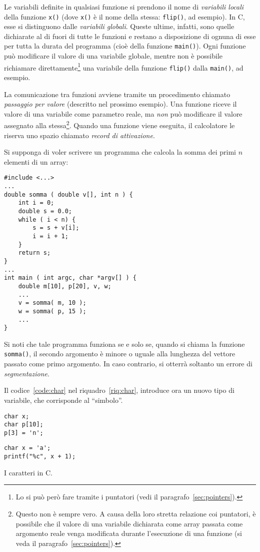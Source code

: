 Le variabili definite in qualsiasi funzione si prendono il nome di \emph{variabili locali} della funzione \lstinline!x()! (dove \lstinline!x()! è il nome della stessa: \lstinline!flip()!, ad esempio). In C, esse si distinguono dalle  \emph{variabili globali}. Queste ultime, infatti, sono quelle dichiarate al di fuori di tutte le funzioni e restano a disposizione di ognuna di esse per tutta la durata del programma (cioè della funzione \lstinline!main()!). Ogni funzione può modificare il valore di una variabile globale, mentre non è possibile richiamare direttamente\footnote{Lo si può però fare tramite i puntatori (vedi il paragrafo~\vref{sec:pointers}).} una variabile della funzione \lstinline!flip()! dalla \lstinline!main()!, ad esempio.

La comunicazione tra funzioni avviene tramite un procedimento chiamato \emph{passaggio per valore} (descritto nel prossimo esempio). Una funzione riceve il valore di una variabile come parametro reale, ma \emph{non} può modificare il valore assegnato alla stessa\footnote{Questo non è sempre vero. A causa della loro stretta relazione coi puntatori, è possibile che il valore di una variabile dichiarata come array passata come argomento reale venga modificata durante l'esecuzione di una funzione (si veda il paragrafo~\vref{sec:pointers}).}. Quando una funzione viene eseguita, il calcolatore le riserva uno spazio chiamato \emph{record di attivazione}.

Si supponga di voler scrivere un programma che calcola la somma dei primi $n$ elementi di un array:
\begin{lstlisting}
#include <...>
...
double somma ( double v[], int n ) {
	int i = 0;
	double s = 0.0;
	while ( i < n) {
		s = s + v[i];
		i = i + 1;
	}
	return s;
}
...
int main ( int argc, char *argv[] ) {
	double m[10], p[20], v, w;
	...
	v = somma( m, 10 );
	w = somma( p, 15 );
	...
}
\end{lstlisting}
Si noti che tale programma funziona se e solo se, quando si chiama la funzione \lstinline!somma()!, il secondo argomento è minore o uguale alla lunghezza del vettore passato come primo argomento. In caso contrario, si otterrà soltanto un errore di \emph{segmentazione}.

Il codice~\ref{code:char} nel riquadro~\vref{riq:char}, introduce ora un nuovo tipo di variabile, che corrisponde al “simbolo”.
\begin{code}
\begin{minipage}{0.45\columnwidth}
	\begin{lstlisting}[caption={\em Il tipo \lstinline!char!.},nolol,label={code:char}]
char x;
char p[10];
p[3] = 'n';
	\end{lstlisting}
\end{minipage}	\hfill
\begin{minipage}{0.45\columnwidth}
	\begin{lstlisting}[caption={\ },nolol,label={code:Printb}]
char x = 'a';
printf("%c", x + 1);
	\end{lstlisting}
\end{minipage}
\caption{I caratteri in C.}
\label{riq:char}
\end{code}

